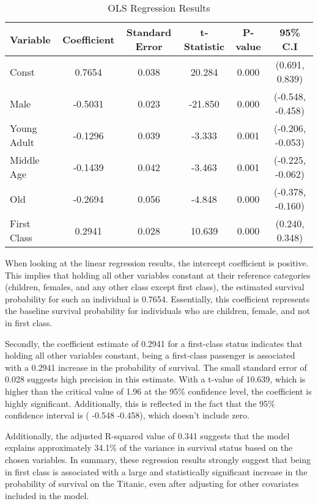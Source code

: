 \documentclass[12pt]{article}
\begin{document}
\begin{table}[H]
\centering
\caption{OLS Regression Results}
\label{tab:ols_results}
\begin{tabular}{@{}lccccc}
\hline
Variable & Coefficient & Standard Error & t-Statistic & P-value & 95\% C.I \\ \hline
Const & 0.7654 & 0.038 & 20.284 & 0.000 & (0.691, 0.839) \\
Male & -0.5031 & 0.023 & -21.850 & 0.000 & (-0.548, -0.458) \\
Young Adult & -0.1296 & 0.039 & -3.333 & 0.001 & (-0.206, -0.053) \\
Middle Age & -0.1439 & 0.042 & -3.463 & 0.001 & (-0.225, -0.062) \\
Old & -0.2694 & 0.056 & -4.848 & 0.000 & (-0.378, -0.160) \\
First Class & 0.2941 & 0.028 & 10.639 & 0.000 & (0.240, 0.348) \\ \hline
\end{tabular}
\end{table}

When looking at the linear regression results, the intercept coefficient is positive. This implies that holding all other variables constant at their reference categories (children, females, and any other class except first class), the estimated survival probability for such an individual is 0.7654. Essentially, this coefficient represents the baseline survival probability for individuals who are children, female, and not in first class.

Secondly, the coefficient estimate of 0.2941 for a first-class status indicates that holding all other variables constant, being a first-class passenger is associated with a 0.2941 increase in the probability of survival. The small standard error of 0.028 suggests high precision in this estimate. With a t-value of 10.639, which is higher than the critical value of 1.96 at the 95\% confidence level, the coefficient is highly significant. Additionally, this is reflected in the fact that the 95\% confidence interval is ( -0.548 -0.458), which doesn’t include zero. 

Additionally, the adjusted R-squared value of 0.341 suggests that the model explains approximately 34.1\% of the variance in survival status based on the chosen variables. In summary, these regression results strongly suggest that being in first class is associated with a large and statistically significant increase in the probability of survival on the Titanic, even after adjusting for other covariates included in the model.
\end{document}
